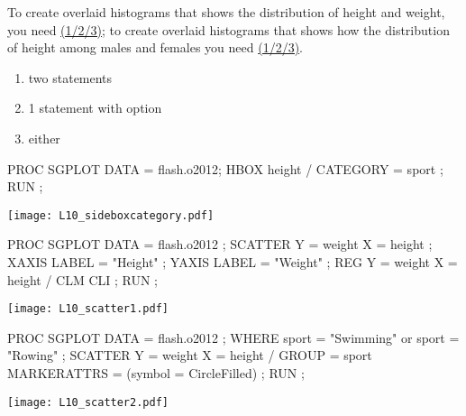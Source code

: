 \begin{frame}
\begin{clicker}{To create overlaid histograms that shows the distribution of height and weight, you need \underline{(1/2/3)}; to create overlaid histograms that shows how the distribution of height among males and females you need \underline{(1/2/3)}.}
\begin{enumerate}
\item two  statements
\item 1  statement with  option
\item either
\end{enumerate}
\end{clicker}
\end{frame}

\begin{frame}[fragile]
\footnotesize
\begin{code}{.0}
PROC SGPLOT DATA = flash.o2012;
   HBOX height / CATEGORY = sport ;
RUN ;
\end{code}
\emp
\vspace{1ex}
\texttt{[image: L10\_sideboxcategory.pdf]}
\emp
\end{frame}


\begin{frame}[fragile]
\footnotesize
\begin{code}{.0}
PROC SGPLOT DATA = flash.o2012 ;
   SCATTER Y = weight X = height ;
   XAXIS LABEL = "Height" ;
   YAXIS LABEL = "Weight" ;
   REG Y = weight X = height / CLM CLI ;
RUN ;
\end{code}
\emp
\vspace{1ex}
\texttt{[image: L10\_scatter1.pdf]}
\emp
\end{frame}


\begin{frame}[fragile]
\footnotesize
\begin{code}{.0}
PROC SGPLOT DATA = flash.o2012 ;
   WHERE sport = "Swimming" or sport = "Rowing" ;
   SCATTER Y = weight X = height /
      GROUP = sport
      MARKERATTRS = (symbol = CircleFilled) ;
RUN ;
\end{code}
\emp
\vspace{1ex}
\texttt{[image: L10\_scatter2.pdf]}
\emp
\end{frame}


